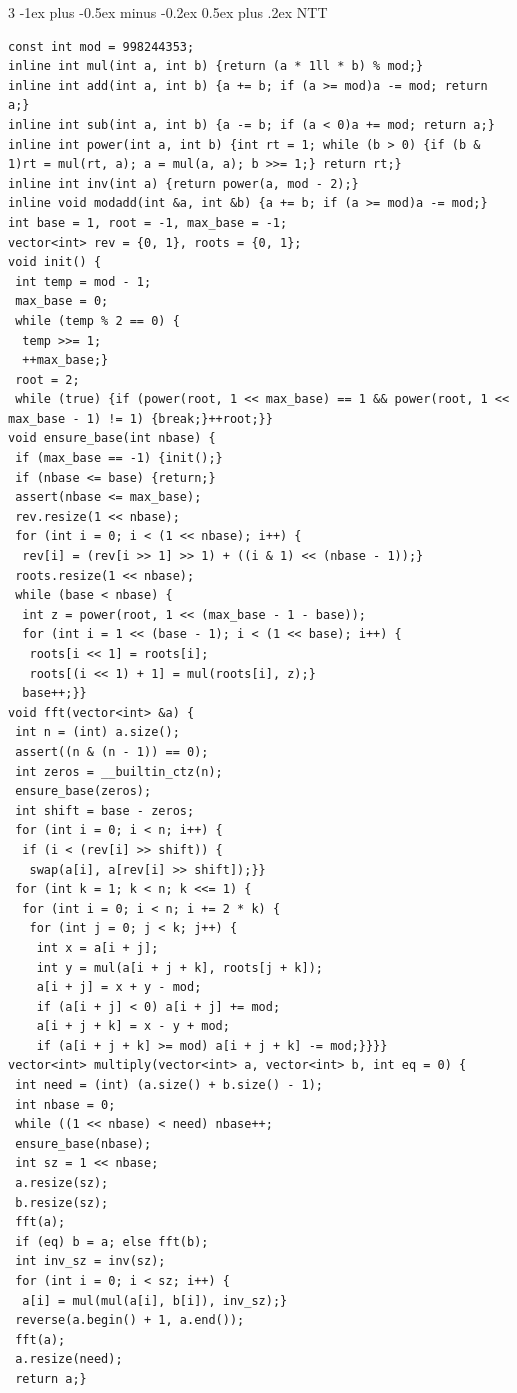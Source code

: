 \documentclass[8pt,a4paper,onesided]{article}
\makeatletter
\renewcommand{\subsection}{\@startsection{subsection}{2}{0mm}
    {-1ex plus -0.5ex minus -0.2ex} %
    {0.5ex plus .2ex}                %
    {\normalfont\large\bfseries}}    %
\makeatother
\begin{document}
\begin{multicols}{3}
\subsection{NTT}
\begin{verbatim}
const int mod = 998244353;
inline int mul(int a, int b) {return (a * 1ll * b) % mod;}
inline int add(int a, int b) {a += b; if (a >= mod)a -= mod; return a;}
inline int sub(int a, int b) {a -= b; if (a < 0)a += mod; return a;}
inline int power(int a, int b) {int rt = 1; while (b > 0) {if (b & 1)rt = mul(rt, a); a = mul(a, a); b >>= 1;} return rt;}
inline int inv(int a) {return power(a, mod - 2);}
inline void modadd(int &a, int &b) {a += b; if (a >= mod)a -= mod;}
int base = 1, root = -1, max_base = -1;
vector<int> rev = {0, 1}, roots = {0, 1};
void init() {
 int temp = mod - 1;
 max_base = 0;
 while (temp % 2 == 0) {
  temp >>= 1;
  ++max_base;}
 root = 2;
 while (true) {if (power(root, 1 << max_base) == 1 && power(root, 1 << max_base - 1) != 1) {break;}++root;}}
void ensure_base(int nbase) {
 if (max_base == -1) {init();}
 if (nbase <= base) {return;}
 assert(nbase <= max_base);
 rev.resize(1 << nbase);
 for (int i = 0; i < (1 << nbase); i++) {
  rev[i] = (rev[i >> 1] >> 1) + ((i & 1) << (nbase - 1));}
 roots.resize(1 << nbase);
 while (base < nbase) {
  int z = power(root, 1 << (max_base - 1 - base));
  for (int i = 1 << (base - 1); i < (1 << base); i++) {
   roots[i << 1] = roots[i];
   roots[(i << 1) + 1] = mul(roots[i], z);}
  base++;}}
void fft(vector<int> &a) {
 int n = (int) a.size();
 assert((n & (n - 1)) == 0);
 int zeros = __builtin_ctz(n);
 ensure_base(zeros);
 int shift = base - zeros;
 for (int i = 0; i < n; i++) {
  if (i < (rev[i] >> shift)) {
   swap(a[i], a[rev[i] >> shift]);}}
 for (int k = 1; k < n; k <<= 1) {
  for (int i = 0; i < n; i += 2 * k) {
   for (int j = 0; j < k; j++) {
    int x = a[i + j];
    int y = mul(a[i + j + k], roots[j + k]);
    a[i + j] = x + y - mod;
    if (a[i + j] < 0) a[i + j] += mod;
    a[i + j + k] = x - y + mod;
    if (a[i + j + k] >= mod) a[i + j + k] -= mod;}}}}
vector<int> multiply(vector<int> a, vector<int> b, int eq = 0) {
 int need = (int) (a.size() + b.size() - 1);
 int nbase = 0;
 while ((1 << nbase) < need) nbase++;
 ensure_base(nbase);
 int sz = 1 << nbase;
 a.resize(sz);
 b.resize(sz);
 fft(a);
 if (eq) b = a; else fft(b);
 int inv_sz = inv(sz);
 for (int i = 0; i < sz; i++) {
  a[i] = mul(mul(a[i], b[i]), inv_sz);}
 reverse(a.begin() + 1, a.end());
 fft(a);
 a.resize(need);
 return a;}
\end{verbatim}

\end{multicols}
\end{document}
